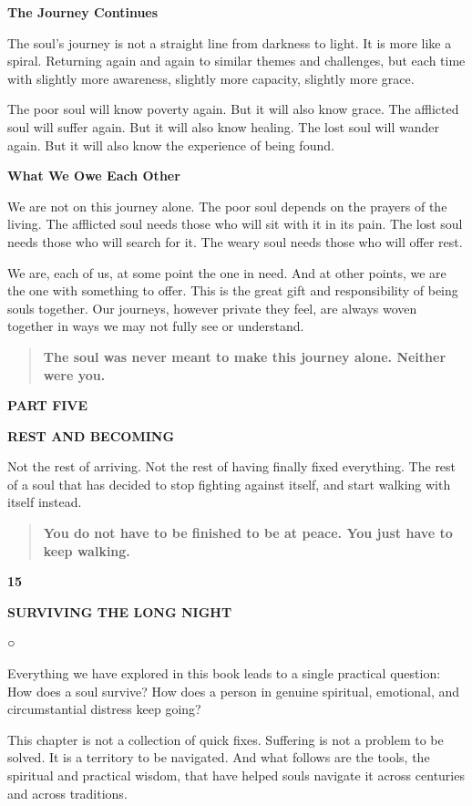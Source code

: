 \textbf{The Journey Continues}

The soul's journey is not a straight line from darkness to light. It is
more like a spiral. Returning again and again to similar themes and
challenges, but each time with slightly more awareness, slightly more
capacity, slightly more grace.

The poor soul will know poverty again. But it will also know grace. The
afflicted soul will suffer again. But it will also know healing. The
lost soul will wander again. But it will also know the experience of
being found.

\textbf{What We Owe Each Other}

We are not on this journey alone. The poor soul depends on the prayers
of the living. The afflicted soul needs those who will sit with it in
its pain. The lost soul needs those who will search for it. The weary
soul needs those who will offer rest.

We are, each of us, at some point the one in need. And at other points,
we are the one with something to offer. This is the great gift and
responsibility of being souls together. Our journeys, however private
they feel, are always woven together in ways we may not fully see or
understand.

\begin{quote}
\textbf{The soul was never meant to make this journey alone. Neither
were you.}
\end{quote}

\textbf{PART FIVE}

\textbf{REST AND BECOMING}

Not the rest of arriving. Not the rest of having finally fixed
everything. The rest of a soul that has decided to stop fighting against
itself, and start walking with itself instead.

\begin{quote}
\textbf{You do not have to be finished to be at peace. You just have to
keep walking.}
\end{quote}

\textbf{15}

\textbf{SURVIVING THE LONG NIGHT}

○

Everything we have explored in this book leads to a single practical
question: How does a soul survive? How does a person in genuine
spiritual, emotional, and circumstantial distress keep going?

This chapter is not a collection of quick fixes. Suffering is not a
problem to be solved. It is a territory to be navigated. And what
follows are the tools, the spiritual and practical wisdom, that have
helped souls navigate it across centuries and across traditions.

